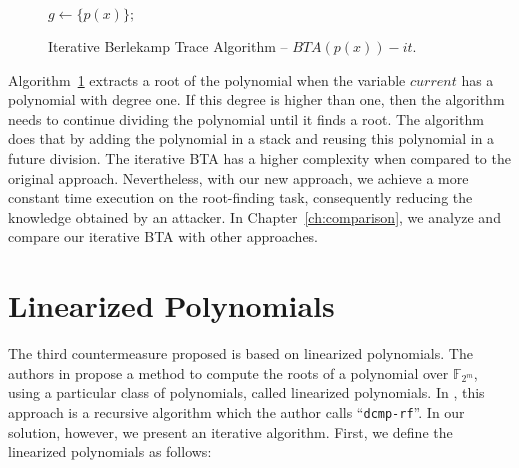 \begin{figure}[ht]
\begin{algorithm}[H]
    $g \gets \{p(x)\};$ 
 \caption{Iterative Berlekamp Trace Algorithm -- $BTA(p(x))-it$.}
  \label{alg:ibta}
\end{algorithm}
\end{figure}

Algorithm~\ref{alg:ibta} extracts a root of the polynomial when the variable $current$ has a polynomial with degree one. If this degree is higher than one, then the algorithm needs to continue dividing the polynomial until it finds a root. The algorithm does that by adding the polynomial in a stack and reusing this polynomial in a future division. The iterative BTA has a higher complexity when compared to the original approach. Nevertheless, with our new approach, we achieve a more constant time execution on the root-finding task, consequently reducing the knowledge obtained by an attacker. In Chapter~\ref{ch:comparison}, we analyze and compare our iterative BTA with other approaches.

\section{Linearized Polynomials}
The third countermeasure proposed is based on linearized polynomials. The authors in \cite{fedorenko2002finding} propose a method to compute the roots of a polynomial over $\mathbb{F}_{2^m}$, using a particular class of polynomials, called linearized polynomials. In \cite{strenzke2012fast}, this approach is a recursive algorithm which the author calls ``\texttt{dcmp-rf}''. In our solution, however, we present an iterative algorithm. First, we define the linearized polynomials as follows:

